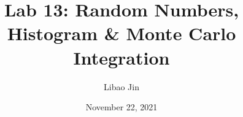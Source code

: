 \title{Lab 13: Random Numbers, Histogram \& Monte Carlo Integration}
\author{Libao Jin}
\date{November 22, 2021}